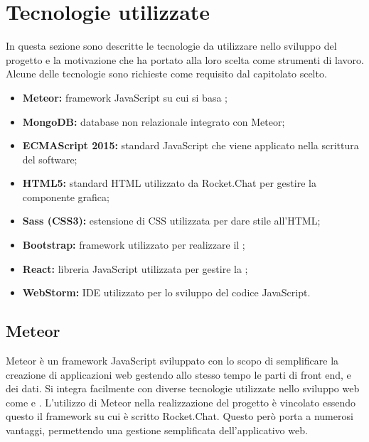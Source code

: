 \section{Tecnologie utilizzate}
In questa sezione sono descritte le tecnologie da utilizzare nello sviluppo del progetto \ProjectName{} e la motivazione che ha portato alla loro scelta come strumenti di lavoro. Alcune delle tecnologie sono richieste come requisito dal capitolato scelto.
\begin{itemize}
	\item \textbf{Meteor:} framework JavaScript su cui si basa ;
	\item \textbf{MongoDB:} database non relazionale integrato con Meteor;
	\item \textbf{ECMAScript 2015:} standard JavaScript che viene applicato nella scrittura del software;
	\item \textbf{HTML5:} standard HTML utilizzato da Rocket.Chat per gestire la componente grafica;
	\item \textbf{Sass (CSS3):} estensione di CSS utilizzata per dare stile all'HTML; 
	\item \textbf{Bootstrap:} framework utilizzato per realizzare il ;
	\item \textbf{React:} libreria JavaScript utilizzata per gestire la ;
	\item \textbf{WebStorm:} IDE utilizzato per lo sviluppo del codice JavaScript.
\end{itemize}

\subsection{Meteor}
Meteor è un framework JavaScript sviluppato con lo scopo di semplificare la creazione di applicazioni web gestendo allo stesso tempo le parti di front end,  e dei dati. Si integra facilmente con diverse tecnologie utilizzate nello sviluppo web come  e .
L'utilizzo di Meteor nella realizzazione del progetto è vincolato essendo questo il framework su cui è scritto Rocket.Chat. Questo però porta a numerosi vantaggi, permettendo una gestione semplificata dell'applicativo web.

